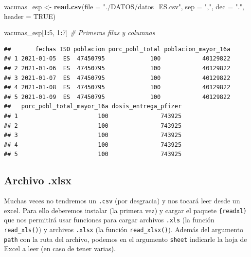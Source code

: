 \documentclass[11pt,]{book}
\newenvironment{Shaded}{\begin{snugshade}}{\end{snugshade}}
\newcommand{\CommentTok}[1]{\textcolor[rgb]{0.37,0.37,0.37}{\textit{#1}}}
\newcommand{\DataTypeTok}[1]{\textcolor[rgb]{0.27,0.27,0.27}{#1}}
\newcommand{\DecValTok}[1]{\textcolor[rgb]{0.06,0.06,0.06}{#1}}
\newcommand{\KeywordTok}[1]{\textcolor[rgb]{0.27,0.27,0.27}{\textbf{#1}}}
\newcommand{\NormalTok}[1]{#1}
\newcommand{\OperatorTok}[1]{\textcolor[rgb]{0.43,0.43,0.43}{\textbf{#1}}}
\newcommand{\OtherTok}[1]{\textcolor[rgb]{0.37,0.37,0.37}{#1}}
\newcommand{\StringTok}[1]{\textcolor[rgb]{0.5,0.5,0.5}{#1}}
\begin{document}
\begin{Shaded}
\begin{Highlighting}[]
\NormalTok{vacunas_esp <-}\StringTok{ }\KeywordTok{read.csv}\NormalTok{(}\DataTypeTok{file =} \StringTok{"./DATOS/datos_ES.csv"}\NormalTok{, }\DataTypeTok{sep =} \StringTok{","}\NormalTok{, }\DataTypeTok{dec =} \StringTok{"."}\NormalTok{, }\DataTypeTok{header =} \OtherTok{TRUE}\NormalTok{)}
\end{Highlighting}
\end{Shaded}

\begin{Shaded}
\begin{Highlighting}[]
\NormalTok{vacunas_esp[}\DecValTok{1}\OperatorTok{:}\DecValTok{5}\NormalTok{, }\DecValTok{1}\OperatorTok{:}\DecValTok{7}\NormalTok{] }\CommentTok{# Primeras filas y columnas}
\end{Highlighting}
\end{Shaded}

\begin{verbatim}
##       fechas ISO poblacion porc_pobl_total poblacion_mayor_16a
## 1 2021-01-05  ES  47450795             100            40129822
## 2 2021-01-06  ES  47450795             100            40129822
## 3 2021-01-07  ES  47450795             100            40129822
## 4 2021-01-08  ES  47450795             100            40129822
## 5 2021-01-09  ES  47450795             100            40129822
##   porc_pobl_total_mayor_16a dosis_entrega_pfizer
## 1                       100               743925
## 2                       100               743925
## 3                       100               743925
## 4                       100               743925
## 5                       100               743925
\end{verbatim}

\hypertarget{archivo-.xlsx}{%
\subsection{Archivo .xlsx}\label{archivo-.xlsx}}

Muchas veces no tendremos un \texttt{.csv} (por desgracia) y nos tocará leer desde un excel. Para ello deberemos instalar (la primera vez) y cargar el paquete \texttt{\{readxl\}} que nos permitirá usar funciones para cargar archivos \texttt{.xls} (la función \texttt{read\_xls()}) y archivos \texttt{.xlsx} (la función \texttt{read\_xlsx()}). Además del argumento \texttt{path} con la ruta del archivo, podemos en el argumento \texttt{sheet} indicarle la hoja de Excel a leer (en caso de tener varias).
\end{document}
